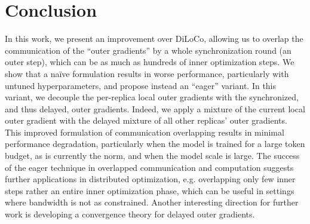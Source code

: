 \section{Conclusion}\label{sec:conclusion}

In this work, we present an improvement over DiLoCo, allowing us to overlap the communication of the ``outer gradients'' by a whole synchronization round (an outer step), which can be as much as hundreds of inner optimization steps. We show that a na\"ive formulation results in worse performance, particularly with untuned hyperparameters, and propose instead an ``eager'' variant. In this variant, we decouple the per-replica local outer gradients with the synchronized, and thus delayed, outer gradients. Indeed, we apply a mixture of the current local outer gradient with the delayed mixture of all other replicas' outer gradients. This improved formulation of communication overlapping results in minimal performance degradation, particularly when the model is trained for a large token budget, as is currently the norm, and when the model scale is large. The success of the eager technique in overlapped communication and computation suggests further applications in distributed optimization, e.g. overlapping only few inner steps rather an entire inner optimization phase, which can be useful in settings where bandwidth is not as constrained. Another interesting direction for further work is developing a convergence theory for delayed outer gradients.
